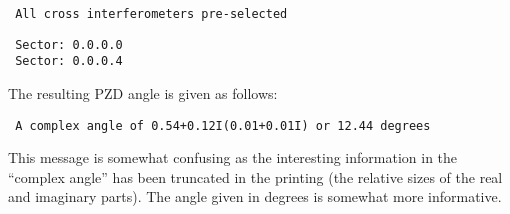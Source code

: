 \spbegin %
\spend %
%
\spbegin %
\suser{\scr}
\spend %
%
\spbegin %
\suser{\scr}
\spend %
%
\spbegin %
\spend %
%
\spbegin %
\sdefault{= *:}
\suser{\scr} %
\svbegin \begin{verbatim}
 All cross interferometers pre-selected
\end{verbatim}\svend
\spend %
%
\spbegin %
\suser{\scr} %
\svbegin \begin{verbatim}
 Sector: 0.0.0.0
 Sector: 0.0.0.4
\end{verbatim}\svend
\spend %

The resulting PZD angle is given as follows:

%
\spbegin %
\svbegin \begin{verbatim}
 A complex angle of 0.54+0.12I(0.01+0.01I) or 12.44 degrees
\end{verbatim}\svend
\spend %

This message is somewhat confusing as the interesting information in the
``complex angle'' has been truncated in the printing (the relative sizes of the
real and imaginary parts). The angle given in degrees is somewhat more
informative.



